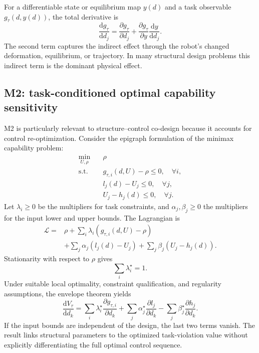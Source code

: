 For a differentiable state or equilibrium map $y(d)$ and a task observable $g_\tau(d,y(d))$, the total derivative is
\begin{equation}
\frac{\mathrm d g_\tau}{\mathrm d d_j}
=
\frac{\partial g_\tau}{\partial d_j}
+
\frac{\partial g_\tau}{\partial y}
\frac{\mathrm d y}{\mathrm d d_j}.
\label{eq:chain-rule}
\end{equation}
The second term captures the indirect effect through the robot's changed deformation, equilibrium, or trajectory. In many structural design problems this indirect term is the dominant physical effect.

\subsection{M2: task-conditioned optimal capability sensitivity}

M2 is particularly relevant to structure--control co-design because it accounts for control re-optimization. Consider the epigraph formulation of the minimax capability problem:
\begin{equation}
\begin{aligned}
\min_{U,\rho}\quad & \rho\\
\mathrm{s.t.}\quad
&g_{\tau,i}(d,U)-\rho\leq0,\quad \forall i,\\
&l_j(d)-U_j\leq0,\quad \forall j,\\
&U_j-h_j(d)\leq0,\quad \forall j.
\end{aligned}
\label{eq:epigraph}
\end{equation}
Let $\lambda_i\geq0$ be the multipliers for task constraints, and $\alpha_j,\beta_j\geq0$ the multipliers for the input lower and upper bounds. The Lagrangian is
\begin{align}
\mathcal L={}&\rho+
\sum_i\lambda_i(g_{\tau,i}(d,U)-\rho)\\
&+\sum_j\alpha_j(l_j(d)-U_j)
+\sum_j\beta_j(U_j-h_j(d)).
\label{eq:lagrangian}
\end{align}
Stationarity with respect to $\rho$ gives
\begin{equation}
\sum_i\lambda_i^\star=1.
\label{eq:lambda-sum}
\end{equation}
Under suitable local optimality, constraint qualification, and regularity assumptions, the envelope theorem yields
\begin{equation}
\boxed{
\frac{\mathrm d V_\tau}{\mathrm d d_k}
=
\sum_i\lambda_i^\star
\frac{\partial g_{\tau,i}}{\partial d_k}
+
\sum_j\alpha_j^\star\frac{\partial l_j}{\partial d_k}
-
\sum_j\beta_j^\star\frac{\partial h_j}{\partial d_k}
}.
\label{eq:envelope}
\end{equation}
If the input bounds are independent of the design, the last two terms vanish. The result links structural parameters to the optimized task-violation value without explicitly differentiating the full optimal control sequence.

